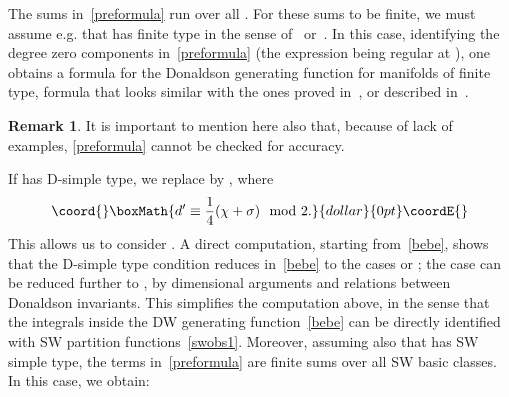 \documentclass[a4paper,12pt,reqno,sumlimits]{amsart}
\theoremstyle{plain}
\theoremstyle{definition}
\newtheorem{rem}[thm]{Remark}
\providecommand{\Z}{{\mathbb Z}}
\providecommand{\1}{{\bf 1}}
\numberwithin{equation}{section}
\begin{document}
The sums in~\eqref{preformula} run over all \coordHE{}.  For these sums to
be finite, we must assume e.g. that \coordHE{} has finite type in the sense
of~\cite{km3} or~\cite{munoz}. In this case, identifying the degree zero
components in~\eqref{preformula} (the expression being regular at \coordHE{}), one
obtains a formula for the Donaldson generating function for manifolds of
finite type, formula that looks similar with the ones proved in~\cite{munoz},
or described in~\cite{km3}.
\begin{rem}
  It is important to mention here also that, because of lack of examples,
  \eqref{preformula} cannot be checked for accuracy.
\end{rem}

If \coordHE{} has D-simple type, we replace \coordHE{} by \coordHE{}, where
$$\coord{}\boxMath{
d'\equiv\frac{1}{4}(\chi+\sigma)\mod 2.
}{dollar}{0pt}\coordE{}$$
This allows us to consider \myHighlight{$k\in\frac{1}{2}\Z$}\coordHE{}. A direct computation,
starting from~\eqref{bebe}, shows that the D-simple type condition reduces
\coordHE{} in~\eqref{bebe} to the cases \coordHE{} or \coordHE{};
the \coordHE{} case can be reduced further to \coordHE{}, by dimensional arguments
and relations between Donaldson invariants.  This simplifies the computation
above, in the sense that the integrals inside the DW generating
function~\eqref{bebe} can be directly identified with SW partition
functions~\eqref{swobs1}.  Moreover, assuming also that \coordHE{} has SW simple
type, the terms \coordHE{} in~\eqref{preformula} are finite sums
over all SW basic classes.  In this case, we obtain:
\end{document}
